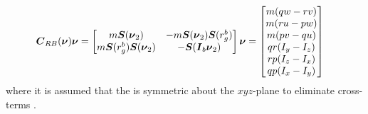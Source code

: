 \begin{equation}
\begin{split}
    \boldsymbol{C}_{RB}(\boldsymbol{\nu})\boldsymbol{\nu} &= 
    \begin{bmatrix}
        m\boldsymbol{S}(\boldsymbol{\nu}_{2})              & -m\boldsymbol{S}(\boldsymbol{\nu}_{2})\boldsymbol{S}(r_g^b)  \\
        m\boldsymbol{S}(r_g^b)\boldsymbol{S}(\boldsymbol{\nu}_{2}) & -\boldsymbol{S}(\boldsymbol{I}_{b}\boldsymbol{\nu}_{2}) \\
    \end{bmatrix}
    \boldsymbol{\nu} = 
    \begin{bmatrix}
    m (q w-r v) \\
    m (r u-p w) \\
    m (p v-q u) \\
    q r(I_{y}-I_{z}) \\
    r p(I_{z}-I_{x}) \\
    q p(I_{x}-I_{y}) \\
    \end{bmatrix}
\end{split}
\end{equation}
where it is assumed that the \abbrROV is symmetric about the $xyz$-plane to eliminate cross-terms \citep[p. 55]{fossen2011}. 

